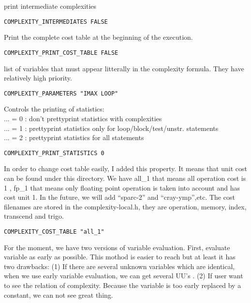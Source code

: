 print intermediate complexities 

\begin{verbatim}
COMPLEXITY_INTERMEDIATES FALSE
\end{verbatim}

Print the complete cost table at the beginning of the execution.

\begin{verbatim}
COMPLEXITY_PRINT_COST_TABLE FALSE
\end{verbatim}

list of variables that must appear litterally in the complexity formula.
They have relatively high priority.

\begin{verbatim}
COMPLEXITY_PARAMETERS "IMAX LOOP"
\end{verbatim}

Controls the printing of statistics:    \\
 ... = 0 : don't prettyprint statistics with complexities  \\
 ... = 1 : prettyprint statistics only for loop/block/test/unstr.
statements \\
 ... = 2 : prettyprint statistics for all statements

\begin{verbatim}
COMPLEXITY_PRINT_STATISTICS 0
\end{verbatim}

In order to change cost table easily, I added this property.
It means that unit cost can be found under this directory. We have all_1
that means all operation cost is 1 , fp_1 that means only floating
point operation is taken into account and has cost unit 1.
In the future, we will add ``sparc-2'' and ``cray-ymp'',etc.
The cost filenames are stored in the complexity-local.h, they are operation,
memory, index, transcend and trigo.

\begin{verbatim}
COMPLEXITY_COST_TABLE "all_1"
\end{verbatim}

For the moment, we have two versions of variable evaluation. First,
evaluate variable as early as possible. This mothod is easier to reach
but at least it has two drawbacks: (1) If there are several unknown
variables which are identical, when we use early variable evaluation, we
can get several UU's . (2) If user want to see the relation of
complexity. Because the variable is too early replaced by a constant, we
can not see great thing.

